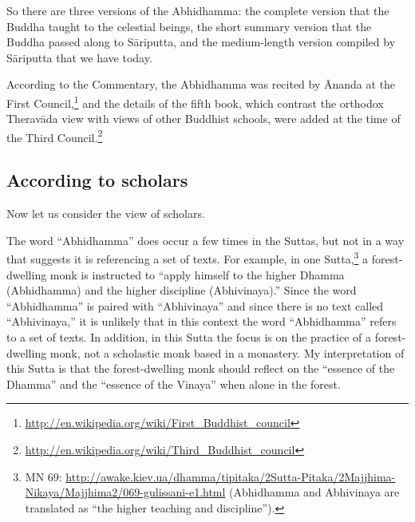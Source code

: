 So there are three versions of the Abhidhamma: the complete version that the Buddha taught to the celestial beings, the short summary version that the Buddha passed along to Sāriputta, and the medium-length version compiled by Sāriputta that we have today. 

According to the Commentary, the Abhidhamma was recited by Ānanda at the First Council,\footnote{\url{http://en.wikipedia.org/wiki/First_Buddhist_council}} and the details of the fifth book, which contrast the orthodox Theravāda view with views of other Buddhist schools, were added at the time of the Third Council.\footnote{\url{http://en.wikipedia.org/wiki/Third_Buddhist_council}}

\subsection*{According to scholars}

Now let us consider the view of scholars. 

The word “Abhidhamma” does occur a few times in the Suttas, but not in a way that suggests it is referencing a set of texts. For example, in one Sutta,\footnote{MN 69: \url{http://awake.kiev.ua/dhamma/tipitaka/2Sutta-Pitaka/2Majjhima-Nikaya/Majjhima2/069-gulissani-e1.html} (Abhidhamma and Abhivinaya are translated as “the higher teaching and discipline”).} a forest-dwelling monk is instructed to “apply himself to the higher Dhamma (Abhidhamma) and the higher discipline (Abhivinaya).” Since the word “Abhidhamma” is paired with “Abhivinaya” and since there is no text called “Abhivinaya,” it is unlikely that in this context the word “Abhidhamma” refers to a set of texts. In addition, in this Sutta the focus is on the practice of a forest-dwelling monk, not a scholastic monk based in a monastery. My interpretation of this Sutta is that the forest-dwelling monk should reflect on the “essence of the Dhamma” and the “essence of the Vinaya” when alone in the forest.

